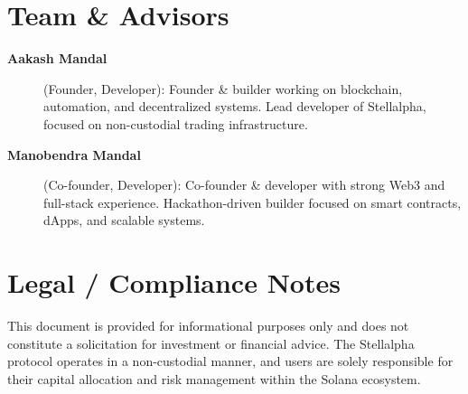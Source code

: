 \section{Team \& Advisors}

\begin{description}
  \item[\textbf{Aakash Mandal}] (Founder, Developer): Founder \& builder working on blockchain, automation, and decentralized systems. Lead developer of Stellalpha, focused on non-custodial trading infrastructure.
  \item[\textbf{Manobendra Mandal}] (Co-founder, Developer): Co-founder \& developer with strong Web3 and full-stack experience. Hackathon-driven builder focused on smart contracts, dApps, and scalable systems.
\end{description}

\section{Legal / Compliance Notes}

This document is provided for informational purposes only and does not constitute a solicitation for investment or financial advice. The Stellalpha protocol operates in a non-custodial manner, and users are solely responsible for their capital allocation and risk management within the Solana ecosystem.
